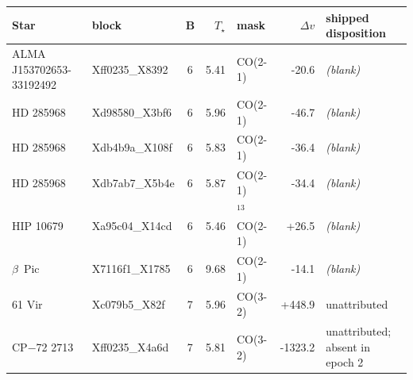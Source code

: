 \begin{tabular}{@{}l@{~}l@{~}c@{~}r@{~}l@{~}r@{~~}l@{}}
\hline
Star & block & B & $T_\star$ & mask & $\Delta v$ & shipped disposition \\
\hline
ALMA J153702653-33192492 & Xff0235\_X8392 & 6 & 5.41 & CO(2-1) & -20.6 & \emph{(blank)} \\
HD 285968 & Xd98580\_X3bf6 & 6 & 5.96 & CO(2-1) & -46.7 & \emph{(blank)} \\
HD 285968 & Xdb4b9a\_X108f & 6 & 5.83 & CO(2-1) & -36.4 & \emph{(blank)} \\
HD 285968 & Xdb7ab7\_X5b4e & 6 & 5.87 & CO(2-1) & -34.4 & \emph{(blank)} \\
HIP 10679 & Xa95c04\_X14cd & 6 & 5.46 & $^{13}$CO(2-1) & +26.5 & \emph{(blank)} \\
$\beta$~Pic & X7116f1\_X1785 & 6 & 9.68 & CO(2-1) & -14.1 & \emph{(blank)} \\
61 Vir & Xc079b5\_X82f & 7 & 5.96 & CO(3-2) & +448.9 & unattributed \\
CP$-$72 2713 & Xff0235\_X4a6d & 7 & 5.81 & CO(3-2) & -1323.2 & unattributed; absent in epoch 2 \\
\hline
\end{tabular}
